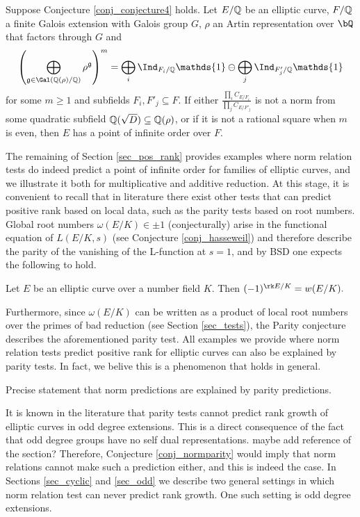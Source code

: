 \begin{thm}\cite[Theorem 33]{DEW1}
    Suppose Conjecture \ref{conj_conjecture4} holds. Let $E/\mathbb{Q}$ be an elliptic curve, $F/\mathbb{Q}$ a finite Galois extension with Galois group $G$, $\rho$ an Artin representation over $\bQ$ that factors through $G$ and 
    $$\left(\bigoplus_{\mathfrak{g}\in\Gal(\QQ(\rho)/\QQ)}\rho^{\mathfrak{g}}\right)^m=\bigoplus_i\Ind_{F_i/\QQ}\mathds{1}\ominus\bigoplus_j\Ind_{F'_j/\QQ}\mathds{1}$$
    for some $m\geq 1$ and subfields $F_i,F'_j\subseteq F$. If either $\frac{\prod_i C_{E/F_i}}{\prod_j C_{E/F'_j}}$ is not a norm from some quadratic subfield $\mathbb{Q}(\sqrt{D})\subseteq\mathbb{Q}(\rho)$, or if it is not a rational square when $m$ is even, then $E$ has a point of infinite order over $F$.
\end{thm}

The remaining of Section \ref{sec_pos_rank} provides examples where norm relation tests do indeed predict a point of infinite order for families of elliptic curves, and we illustrate it both for multiplicative and additive reduction. At this stage, it is convenient to recall that in literature there exist other tests that can predict positive rank based on local data, such as the parity tests based on root numbers. Global root numbers $\omega(E/K)\in{\pm1}$ (conjecturally) arise in the functional equation of $L(E/K,s)$ (see Conjecture \ref{conj_hasseweil}) and therefore describe the parity of the vanishing of the L-function at $s=1$, and by BSD one expects the following to hold.

\begin{conj}\label{conj_parity}
    Let $E$ be an elliptic curve over a number field $K$. Then
    $(-1)^{\rk E / K} = w(E / K).$
\end{conj}

Furthermore, since $\omega(E/K)$ can be written as a product of local root numbers over the primes of bad reduction (see Section \ref{sec_tests}), the Parity conjecture describes the aforementioned parity test. All examples we provide where norm relation tests predict positive rank for elliptic curves can also be explained by parity tests. In fact, we belive this is a phenomenon that holds in general.

\begin{conj}\label{conj_normparity}
    {\color{red} Precise statement that norm predictions are explained by parity predictions.}
\end{conj}

It is known in the literature that parity tests cannot predict rank growth of elliptic curves in odd degree extensions. This is a direct consequence of the fact that odd degree groups have no self dual representations. {\color{red} maybe add reference of the section?} Therefore, Conjecture \ref{conj_normparity} would imply that norm relations cannot make such a prediction either, and this is indeed the case. In Sections \ref{sec_cyclic} and \ref{sec_odd} we describe two general settings in which norm relation test can never predict rank growth. One such setting is odd degree extensions.

